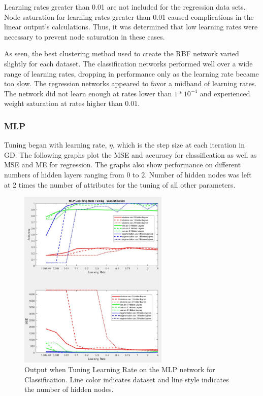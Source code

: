 \documentclass[twoside,10pt]{article}
\begin{document}
Learning rates greater than 0.01 are not included for the regression data sets. Node saturation for learning rates greater than 0.01 caused complications in the linear output's calculations. Thus, it was determined that low learning rates were necessary to prevent node saturation in these cases.

As seen, the best clustering method used to create the RBF network varied slightly for each dataset. The classification networks performed well over a wide range of learning rates, dropping in performance only as the learning rate became too slow. The regression networks appeared to favor a midband of learning rates. The network did not learn enough at rates lower than $1*10^{-4}$ and experienced weight saturation at rates higher than $0.01$.

\subsubsection{MLP}
Tuning began with learning rate, $\eta$, which is the step size at each iteration in GD. The following graphs plot the MSE and accuracy for classification as well as MSE and ME for regression. The graphs also show performance on different numbers of hidden layers ranging from 0 to 2. Number of hidden nodes was left at 2 times the number of attributes for the tuning of all other parameters.
\begin{figure}[h]
	\centering
	\includegraphics[height=3.4in]{FINAL_FIGS/MLP_LR_TUNING_CLASS.JPG}
	\caption{Output when Tuning Learning Rate on the MLP network for Classification. Line color indicates dataset and line style indicates the number of hidden nodes.}
\end{figure}
\end{document}
